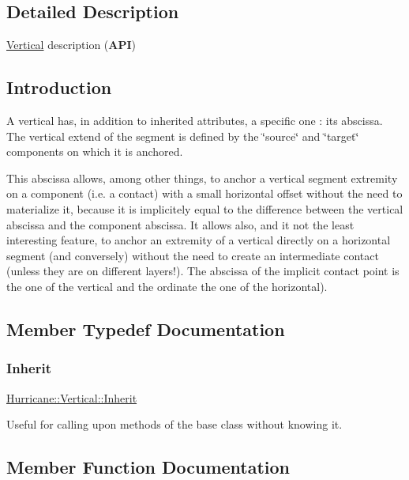 \subsection{Detailed Description}
\mbox{\hyperlink{classHurricane_1_1Vertical}{Vertical}} description ({\bfseries A\+PI}) 

\hypertarget{classHurricane_1_1Vertical_secVerticalIntro}{}\subsection{Introduction}\label{classHurricane_1_1Vertical_secVerticalIntro}
A vertical has, in addition to inherited attributes, a specific one \+: its abscissa. The vertical extend of the segment is defined by the \char`\"{}source\char`\"{} and \char`\"{}target\char`\"{} components on which it is anchored.

This abscissa allows, among other things, to anchor a vertical segment extremity on a component (i.\+e. a contact) with a small horizontal offset without the need to materialize it, because it is implicitely equal to the difference between the vertical abscissa and the component abscissa. It allows also, and it not the least interesting feature, to anchor an extremity of a vertical directly on a horizontal segment (and conversely) without the need to create an intermediate contact (unless they are on different layers!). The abscissa of the implicit contact point is the one of the vertical and the ordinate the one of the horizontal). 

\subsection{Member Typedef Documentation}
\mbox{\label{classHurricane_1_1Vertical_a0132a4151899b356b157562c792294fd}} 
\subsubsection{\texorpdfstring{Inherit}{Inherit}}
{\footnotesize\ttfamily \mbox{\hyperlink{classHurricane_1_1Vertical_a0132a4151899b356b157562c792294fd}{Hurricane\+::\+Vertical\+::\+Inherit}}}

Useful for calling upon methods of the base class without knowing it. 

\subsection{Member Function Documentation}
\mbox{\label{classHurricane_1_1Vertical_a1ff223aa8f0b9ffe3aefc5e3ade6d34a}} 

